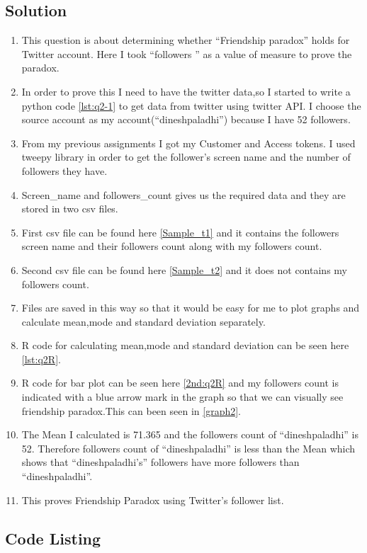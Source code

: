 \subsection{Solution}
\begin{enumerate}
\item This question is about determining whether ``Friendship paradox'' holds for Twitter account. Here I took ``followers '' as a value of measure to prove the paradox.
\item In order to prove this I need to have the twitter data,so I started to write a python code \ref{lst:q2-1} to get data from twitter using twitter API. I choose the source account as my account(``dineshpaladhi'') because I have 52 followers.
\item From my previous assignments I got my Customer and Access tokens. I used tweepy library in order to get the follower's screen name and the number of followers they have.
\item Screen\_name and followers\_count gives us the required data and they are stored in two csv files.
\item First csv file can be found here \ref{Sample_t1} and it contains the followers screen name and their followers count along with my followers count.
\item Second csv file can be found here \ref{Sample_t2} and it does not contains my followers count.
\item Files are saved in this way so that it would be easy for me to plot graphs and calculate mean,mode and standard deviation separately.
\item R code for calculating mean,mode and standard deviation can be seen here \ref{lst:q2R}.
\item R code for bar plot can be seen here \ref{2nd:q2R} and my followers count is indicated with a blue arrow mark in the graph so that we can visually see friendship paradox.This can been seen in \ref{graph2}.
\item The Mean I calculated is 71.365 and the followers count of ``dineshpaladhi'' is 52. Therefore followers count of ``dineshpaladhi'' is less than the Mean which shows that ``dineshpaladhi's'' followers have more followers than ``dineshpaladhi''.  
\item This proves Friendship Paradox using Twitter's follower list.

\end{enumerate}
\newpage
\subsection{Code Listing}


